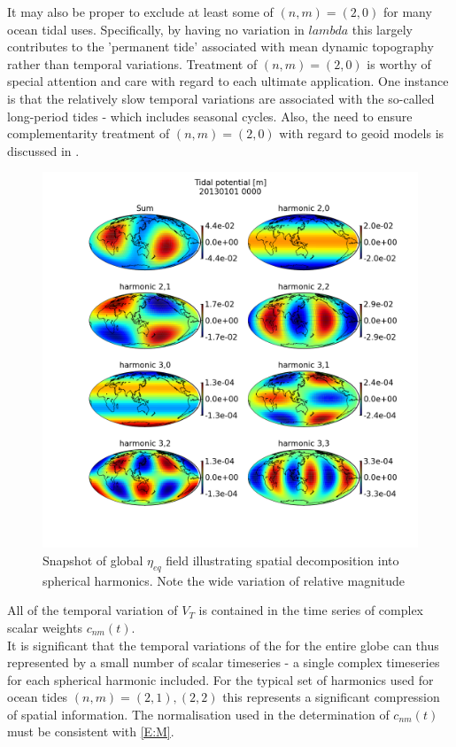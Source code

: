 It may also be proper to exclude at least some of $(n,m) = (2,0)$ for many ocean tidal uses.  Specifically, by having no variation in $lambda$ this largely contributes to the 'permanent tide' associated with mean dynamic topography rather than temporal variations.  Treatment of $(n,m) = (2,0)$ is worthy of special attention and care with regard to each ultimate application.  One instance is that the relatively slow temporal variations are associated with the so-called long-period tides - which includes seasonal cycles.  Also, the need to ensure complementarity treatment of $(n,m) = (2,0)$ with regard to geoid models is discussed in \cite[section 5.3.3.2]{Urban:2013vl}.

\begin{figure}[h]
\begin{center}
\includegraphics[width=\figwidthBig]{figures/maps/tidal_potential_spatial_20130101_0000.png}
\caption{Snapshot of global $\eta_{eq}$ field illustrating spatial decomposition into spherical harmonics.  Note the wide variation of relative magnitude}
\label{fig:VT_EG}
\end{center}
\end{figure}


All of the temporal variation of $V_T$ is contained in the time series of complex scalar weights $c_{nm}(t)$.\\
It is significant that the temporal variations of the \ATGP{} for the entire globe can thus represented by a small number of scalar timeseries - a single complex timeseries for each spherical harmonic included.  For the typical set of harmonics used for ocean tides $(n,m)=(2,1),(2,2)$ this represents a significant compression of spatial information.  The normalisation used in the determination of $c_{nm}(t)$ must be consistent with \ref{E:M}.\\

